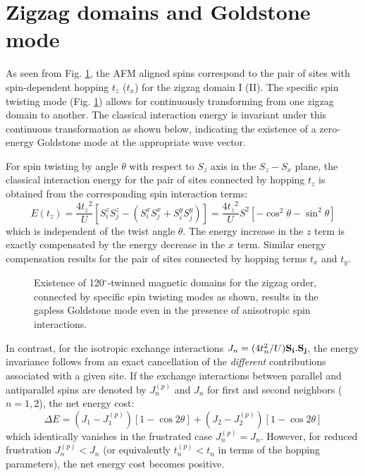\documentclass[aps,prb,fleqn,12pt,amsmath,amssymb]{revtex4}
\begin{document}
\section{Zigzag domains and Goldstone mode}

As seen from Fig. \ref{domains}, the AFM aligned spins correspond to the pair of sites with spin-dependent hopping $t_z$ ($t_x$) for the zigzag domain I (II). The specific spin twisting mode (Fig. \ref{domains}) allows for continuously transforming from one zigzag domain to another. The classical interaction energy is invariant under this continuous transformation as shown below, indicating the existence of a zero-energy Goldstone mode at the appropriate wave vector. 

For spin twisting by angle $\theta$ with respect to $S_z$ axis in the $S_z - S_x$ plane, the classical interaction energy for the pair of sites connected by hopping $t_z$ is obtained from the corresponding spin interaction terms:
\begin{equation}
E(t_z) = \frac{4{t_z}^2}{U} \left [ S_i ^z S_j ^z - (S_i ^x S_j ^x + S_i ^y S_j ^y) \right ] 
= \frac{4 {t_z}^2}{U} S^2 \left [ - \cos ^2 \theta - \sin ^2 \theta \right ] 
\end{equation}
which is independent of the twist angle $\theta$. The energy increase in the $z$ term is exactly compensated by the energy decrease in the $x$ term. Similar energy compensation results for the pair of sites connected by hopping terms $t_x$ and $t_y$. 

\begin{figure}
\vspace*{0mm}
\hspace*{0mm}
\caption{Existence of 120$^\circ$-twinned magnetic domains for the zigzag order, connected by specific spin twisting modes as shown, results in the gapless Goldstone mode even in the presence of anisotropic spin interactions.} 
\label{domains}
\end{figure}

In contrast, for the isotropic exchange interactions $J_n = (4t_n ^2/U) {\bf S_i}.{\bf S_j}$, the energy invariance follows from an exact cancellation of the {\em different} contributions associated with a given site. If the exchange interactions between parallel and antiparallel spins are denoted by $J_n ^{(p)}$ and $J_n$ for first and second neighbors ($n=1,2$), the net energy cost:
\begin{equation}
\Delta E = \left (J_1 - J_1 ^{(p)} \right ) [1-\cos 2\theta] 
+ \left (J_2 - J_2 ^{(p)} \right ) [1-\cos 2\theta]
\end{equation}
which identically vanishes in the frustrated case $J_n ^{(p)} = J_n$. However, for reduced frustration $J_n ^{(p)} < J_n$ (or equivalently $t_n ^{(p)} < t_n$ in terms of the hopping parameters), the net energy cost becomes positive. 
\end{document}

